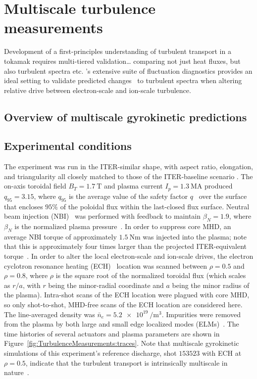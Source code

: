 \chapter{Multiscale turbulence measurements}
\label{ch:TurbulenceMeasurements}
Development of a first-principles understanding
of turbulent transport in a tokamak
requires multi-tiered validation\ldots
comparing not just heat fluxes, but
also turbulent spectra etc.
\diiid's extensive suite of fluctuation diagnostics
provides an ideal setting to validate
predicted changes~\cite{howard_pp16}
to turbulent spectra when altering relative drive
between electron-scale and ion-scale turbulence.


\section{Overview of multiscale gyrokinetic predictions}


\section{Experimental conditions}
The experiment was run in the ITER-similar shape,
with aspect ratio, elongation, and triangularity
all closely matched to those of the ITER-baseline scenario
\cite[Sec.~13.5 \& 13.6]{wesson}.
The on-axis toroidal field $B_T = \SI{1.7}{\tesla}$ and
plasma current $I_p = \SI{1.3}{\mega\ampere}$
produced $q_{95} = 3.15$,
where $q_{95}$ is the average value
of the safety factor $q$~\cite[Sec.~3.4]{wesson}
over the surface that encloses $95\%$
of the poloidal flux within the last-closed flux surface.
Neutral beam injection (NBI)~\cite[Sec.~5.3-5.5]{wesson}
was performed with feedback to maintain
$\beta_N = 1.9$, where
$\beta_N$ is the normalized plasma pressure~\cite[Sec.~6.18]{wesson}.
In order to suppress core MHD,
an average NBI torque of approximately $\SI{1.5}{\newton \meter}$
was injected into the plasma;
note that this is approximately four times larger than
the projected ITER-equivalent torque~\cite{garofalo_nf11}.
In order to alter the local electron-scale and ion-scale drives,
the electron cyclotron resonance heating (ECH)~\cite[Sec.~5.10]{wesson}
location was scanned between $\rho = 0.5$ and $\rho = 0.8$,
where $\rho$ is the square root of the normalized toroidal flux
(which scales as $r / a$, with
$r$ being the minor-radial coordinate and
$a$ being the minor radius of the plasma).
Intra-shot scans of the ECH location
were plagued with core MHD, so
only shot-to-shot, MHD-free scans of the ECH location
are considered here.
The line-averaged density was
$\bar{n}_e = \SI{5.2e19}{\per\meter\cubed}$.
Impurities were removed from the plasma
by both large and small edge localized modes (ELMs)~\cite[Sec.~7.17]{wesson}.
The time histories of several actuators and plasma parameters
are shown in Figure~\ref{fig:TurbulenceMeasurements:traces}.
Note that multiscale gyrokinetic simulations
of this experiment's reference discharge,
\diiid\space shot $153523$ with ECH at $\rho = 0.5$,
indicate that the turbulent transport
is intrinsically multiscale in nature~\cite{holland_nf17}.

